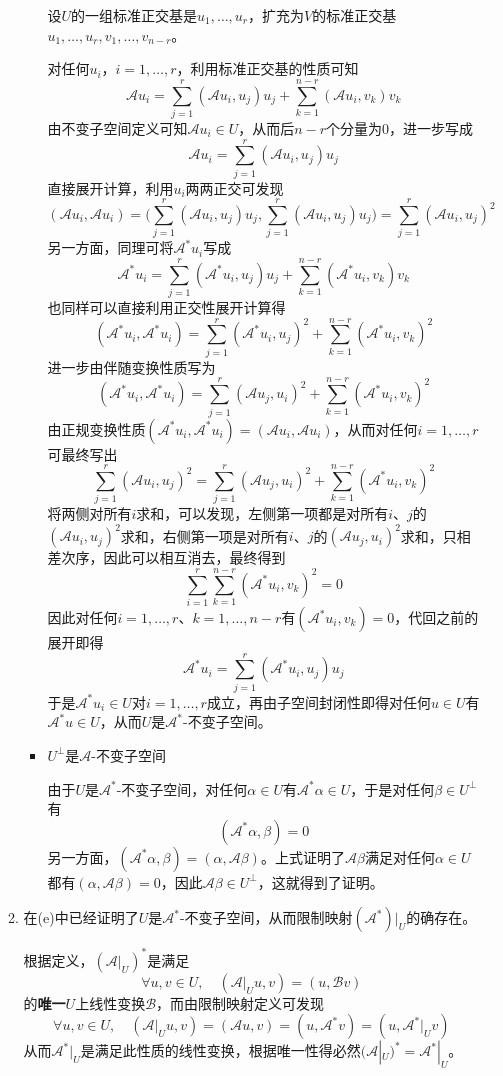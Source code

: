 \documentclass[a4paper,UTF8,fontset=windows,AutoFakeBold]{ctexart}
\newcommand*{\ma}{\mathcal{A}}
\newcommand*{\mb}{\mathcal{B}}
\begin{document}
\begin{enumerate}
\begin{enumerate}
\begin{itemize}
            设$U$的一组标准正交基是$u_1,\dots,u_r$，扩充为$V$的标准正交基$u_1,\dots,u_r,v_1,\dots,v_{n-r}$。

            对任何$u_i$，$i=1,\dots,r$，利用标准正交基的性质可知
            $$\ma u_i=\sum_{j=1}^r(\ma u_i,u_j)u_j+\sum_{k=1}^{n-r}(\ma u_i,v_k)v_k$$
            由不变子空间定义可知$\ma u_i\in U$，从而后$n-r$个分量为0，进一步写成
            $$\ma u_i=\sum_{j=1}^r(\ma u_i,u_j)u_j$$
            直接展开计算，利用$u_i$两两正交可发现
            $$(\ma u_i,\ma u_i)=\bigg(\sum_{j=1}^r(\ma u_i,u_j)u_j,\sum_{j=1}^r(\ma u_i,u_j)u_j\bigg)=\sum_{j=1}^r(\ma u_i,u_j)^2$$
            另一方面，同理可将$\ma^*u_i$写成
            $$\ma^*u_i=\sum_{j=1}^r(\ma^*u_i,u_j)u_j+\sum_{k=1}^{n-r}(\ma^*u_i,v_k)v_k$$
            也同样可以直接利用正交性展开计算得
            $$(\ma^*u_i,\ma^*u_i)=\sum_{j=1}^r(\ma^*u_i,u_j)^2+\sum_{k=1}^{n-r}(\ma^*u_i,v_k)^2$$
            进一步由伴随变换性质写为
            $$(\ma^*u_i,\ma^*u_i)=\sum_{j=1}^r(\ma u_j,u_i)^2+\sum_{k=1}^{n-r}(\ma^*u_i,v_k)^2$$
            由正规变换性质$(\ma^*u_i,\ma^*u_i)=(\ma u_i,\ma u_i)$，从而对任何$i=1,\dots,r$可最终写出
            $$\sum_{j=1}^r(\ma u_i,u_j)^2=\sum_{j=1}^r(\ma u_j,u_i)^2+\sum_{k=1}^{n-r}(\ma^*u_i,v_k)^2$$
            将两侧对所有$i$求和，可以发现，左侧第一项都是对所有$i$、$j$的$(\ma u_i,u_j)^2$求和，右侧第一项是对所有$i$、$j$的$(\ma u_j,u_i)^2$求和，只相差次序，因此可以相互消去，最终得到
            $$\sum_{i=1}^r\sum_{k=1}^{n-r}(\ma^*u_i,v_k)^2=0$$
            因此对任何$i=1,\dots,r$、$k=1,\dots,n-r$有$(\ma^*u_i,v_k)=0$，代回之前的展开即得
            $$\ma^*u_i=\sum_{j=1}^r(\ma^*u_i,u_j)u_j$$
            于是$\ma^*u_i\in U$对$i=1,\dots,r$成立，再由子空间封闭性即得对任何$u\in U$有$\ma^*u\in U$，从而$U$是$\ma^*$-不变子空间。

            \item $U^\bot$是$\ma$-不变子空间
            
            由于$U$是$\ma^*$-不变子空间，对任何$\alpha\in U$有$\ma^*\alpha\in U$，于是对任何$\beta\in U^\bot$有
            $$(\ma^*\alpha,\beta)=0$$
            另一方面，$(\ma^*\alpha,\beta)=(\alpha,\ma\beta)$。上式证明了$\ma\beta$满足对任何$\alpha\in U$都有$(\alpha,\ma\beta)=0$，因此$\ma\beta\in U^\bot$，这就得到了证明。
        \end{itemize}

        \item 在(e)中已经证明了$U$是$\ma^*$-不变子空间，从而限制映射$(\ma^*)|_U$的确存在。
        
        根据定义，$(\ma|_U)^*$是满足
        $$\forall u,v\in U,\quad(\ma|_Uu,v)=(u,\mb v)$$
        的\textbf{唯一}$U$上线性变换$\mb$，而由限制映射定义可发现
        $$\forall u,v\in U,\quad(\ma|_Uu,v)=(\ma u,v)=(u,\ma^*v)=(u,\ma^*|_Uv)$$
        从而$\ma^*|_U$是满足此性质的线性变换，根据唯一性得必然$(\ma|_U)^*=\ma^*|_U$。


\end{enumerate}
\end{enumerate}
\end{document}

